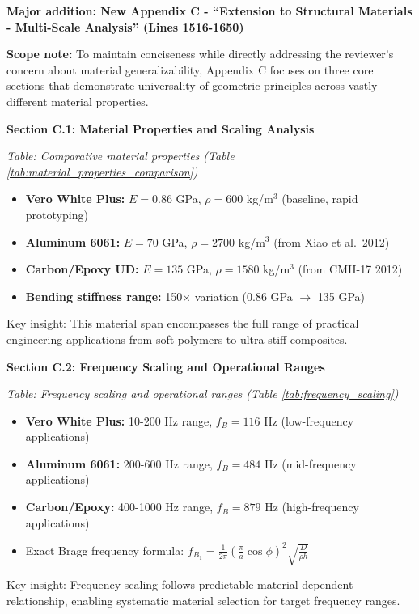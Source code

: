 \documentclass[11pt,a4paper]{article}
\newenvironment{changesbox}{%
    \par\medskip\noindent{\color{changescolor}\rule{\linewidth}{2pt}}\par
    \noindent{\color{changescolor}\bfseries Manuscript Changes}\par\smallskip
}{%
    \par\noindent{\color{changescolor}\rule{\linewidth}{0.5pt}}\medskip
}
\begin{document}
\begin{changesbox}
\textbf{Major addition: New Appendix C - ``Extension to Structural Materials - Multi-Scale Analysis'' (Lines 1516-1650)}

\textbf{Scope note:} To maintain conciseness while directly addressing the reviewer's concern about material generalizability, Appendix C focuses on three core sections that demonstrate universality of geometric principles across vastly different material properties.

\textbf{Section C.1: Material Properties and Scaling Analysis}

\textit{Table: Comparative material properties (Table \ref{tab:material_properties_comparison})}
\begin{itemize}
    \item \textbf{Vero White Plus:} $E = 0.86$ GPa, $\rho = 600$ kg/m$^3$ (baseline, rapid prototyping)
    \item \textbf{Aluminum 6061:} $E = 70$ GPa, $\rho = 2700$ kg/m$^3$ (from Xiao et al.~2012)
    \item \textbf{Carbon/Epoxy UD:} $E = 135$ GPa, $\rho = 1580$ kg/m$^3$ (from CMH-17 2012)
    \item \textbf{Bending stiffness range:} 150$\times$ variation (0.86 GPa $\to$ 135 GPa)
\end{itemize}

Key insight: This material span encompasses the full range of practical engineering applications from soft polymers to ultra-stiff composites.

\textbf{Section C.2: Frequency Scaling and Operational Ranges}

\textit{Table: Frequency scaling and operational ranges (Table \ref{tab:frequency_scaling})}
\begin{itemize}
    \item \textbf{Vero White Plus:} 10-200 Hz range, $f_B = 116$ Hz (low-frequency applications)
    \item \textbf{Aluminum 6061:} 200-600 Hz range, $f_B = 484$ Hz (mid-frequency applications)
    \item \textbf{Carbon/Epoxy:} 400-1000 Hz range, $f_B = 879$ Hz (high-frequency applications)
    \item Exact Bragg frequency formula: $f_{B_1} = \frac{1}{2\pi}\left(\frac{\pi}{a}\cos\phi\right)^2 \sqrt{\frac{D}{\rho h}}$
\end{itemize}

Key insight: Frequency scaling follows predictable material-dependent relationship, enabling systematic material selection for target frequency ranges.


\end{changesbox}
\end{document}
